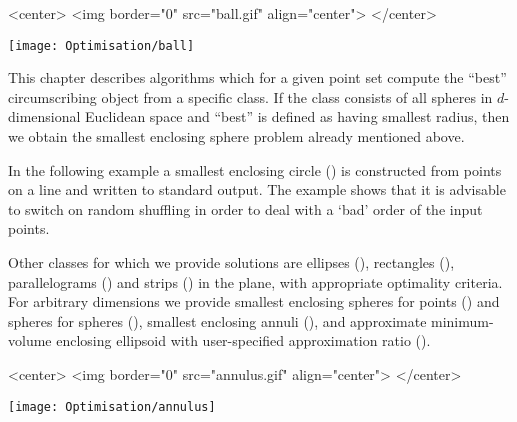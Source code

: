 
\begin{ccHtmlOnly}
<center>
<img border="0" src="ball.gif" align="center">
</center>
\end{ccHtmlOnly} 

\begin{ccTexOnly}
\begin{center}
\texttt{[image: Optimisation/ball]}
\end{center}
\end{ccTexOnly}


This chapter describes algorithms which for a given point set compute
the ``best'' circumscribing  object from a specific
class. If the class consists of all spheres in $d$-dimensional
Euclidean space and ``best'' is defined as having smallest radius,
then we obtain the smallest enclosing sphere problem already mentioned
above.

In the following example a smallest enclosing circle
() is constructed from points 
on a line and written to standard output. The example
shows that it is advisable to switch on random shuffling 
in order to deal with a `bad' order of the input points. 


Other classes for which we provide solutions are ellipses
(), rectangles
(), parallelograms
() and strips ()
in the plane, with appropriate optimality criteria. For arbitrary
dimensions we provide smallest enclosing spheres for points
() and spheres for spheres
(), smallest enclosing
annuli (), and approximate
minimum-volume enclosing ellipsoid with user-specified
approximation ratio ().

\begin{ccHtmlOnly}
<center>
<img border="0" src="annulus.gif" align="center">
</center>
\end{ccHtmlOnly} 

\begin{ccTexOnly}
\begin{center}
\texttt{[image: Optimisation/annulus]}
\end{center}
\end{ccTexOnly}

